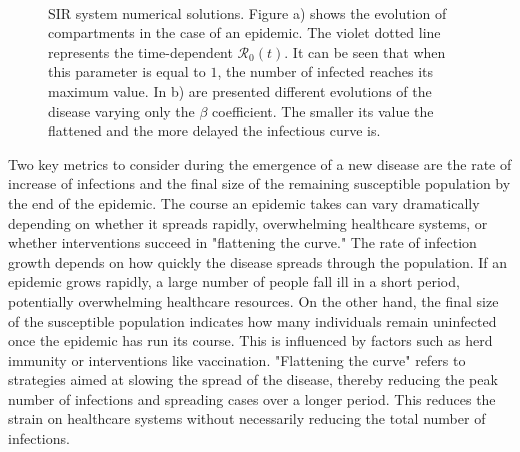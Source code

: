 \begin{figure}[ht]
	\centering
	 \quad
	 \\
	\caption[SIR dynamic example]{SIR system numerical solutions. Figure a) shows the evolution of compartments in the case of an epidemic. The violet dotted line represents the time-dependent $\mathcal{R}_0(t)$. It can be seen that when this parameter is equal to $1$, the number of infected reaches its maximum value. In b) are presented different evolutions of the disease varying only the $\beta$ coefficient. The smaller its value the flattened and the more delayed the infectious curve is.}
	\label{fig:sir_example0}
\end{figure}
Two key metrics to consider during the emergence of a new disease are the rate of increase of infections and the final size of the remaining susceptible population by the end of the epidemic. The course an epidemic takes can vary dramatically depending on whether it spreads rapidly, overwhelming healthcare systems, or whether interventions succeed in "flattening the curve."
The rate of infection growth depends on how quickly the disease spreads through the population. If an epidemic grows rapidly, a large number of people fall ill in a short period, potentially overwhelming healthcare resources.
On the other hand, the final size of the susceptible population indicates how many individuals remain uninfected once the epidemic has run its course. This is influenced by factors such as herd immunity or interventions like vaccination.
"Flattening the curve" refers to strategies aimed at slowing the spread of the disease, thereby reducing the peak number of infections and spreading cases over a longer period. This reduces the strain on healthcare systems without necessarily reducing the total number of infections.

